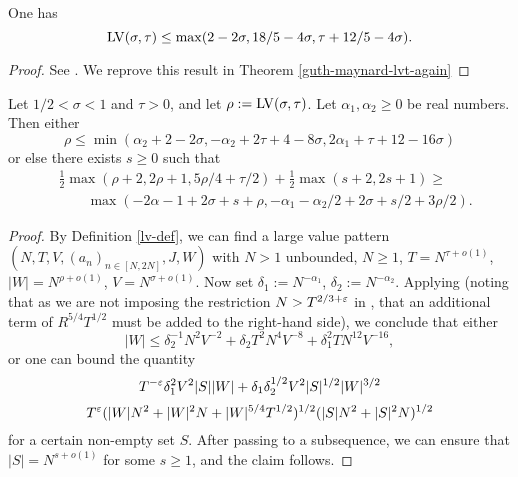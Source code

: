 \begin{theorem}\label{guth-maynard-lvt} One has
$$ \mathrm{LV}(\sigma,\tau) \leq \max(2-2\sigma, 18/5 - 4 \sigma, \tau + 12/5 - 4\sigma).$$
\end{theorem}

\begin{proof}
See \cite[Theorem~1.1]{guth-maynard}. We reprove this result in Theorem \ref{guth-maynard-lvt-again}
\end{proof}

\begin{theorem}\label{bourgain-lvt} \cite{bourgain_large_2000} Let $1/2 < \sigma < 1$ and $\tau > 0$, and let $\rho := \mathrm{LV}(\sigma,\tau)$.  Let $\alpha_1, \alpha_2 \geq 0$ be real numbers.  Then either
$$ \rho \leq \min( \alpha_2 + 2 - 2 \sigma, -\alpha_2 + 2\tau+4-8\sigma, 2\alpha_1 + \tau + 12 - 16 \sigma)$$
or else there exists $s \geq 0$ such that
\begin{equation}\label{rs}
\begin{split}
     &\frac{1}{2}\max(\rho+2, 2\rho+1, 5\rho/4 + \tau/2) + \frac{1}{2}\max(s+2, 2s+1) \geq \\
		&\qquad\max( -2\alpha-1 + 2\sigma + s + \rho, -\alpha_1 - \alpha_2/2 + 2\sigma + s/2 + 3\rho/2).
\end{split}
\end{equation}
\end{theorem}

\begin{proof}  By Definition \ref{lv-def}, we can find a large value pattern $(N,T,V,(a_n)_{n \in [N,2N]},J,W)$ with $N>1$ unbounded, $N \geq 1$, $T = N^{\tau+o(1)}$, $|W| = N^{\rho+o(1)}$, $V = N^{\sigma+o(1)}$.  Now set $\delta_1 := N^{-\alpha_1}$, $\delta_2 := N^{-\alpha_2}$.  Applying \cite[(4.41), (4.42), (4.55), (4.57)]{bourgain_large_2000} (noting that as we are not imposing the restriction $N > T^{2/3+\varepsilon}$ in \cite[Lemma 3.7]{bourgain_large_2000}, that an additional term of $R^{5/4} T^{1/2}$ must be added to the right-hand side), we conclude that either
$$ |W| \leq \delta_2^{-1} N^2 V^{-2} + \delta_2 T^2 N^4 V^{-8} + \delta_1^2 T N^{12} V^{-16},$$
or one can bound the quantity
$$ T^{-\varepsilon} \delta_1^2 V^2 |S| |W| + \delta_1 \delta_2^{1/2} V^2 |S|^{1/2} |W|^{3/2}$$
$$ T^\varepsilon (|W|N^2 + |W|^2 N + |W|^{5/4} T^{1/2})^{1/2} (|S| N^2 + |S|^2 N)^{1/2}$$
for a certain non-empty set $S$.  After passing to a subsequence, we can ensure that $|S| = N^{s+o(1)}$ for some $s \geq 1$, and the claim follows.
\end{proof}

